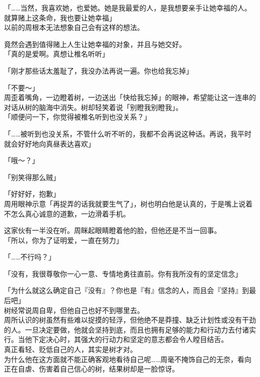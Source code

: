 「……当然，我喜欢她，也爱她。她是我最爱的人，是我想要亲手让她幸福的人。就算赌上这条命，我也要让她幸福」\\

以前的周根本无法想象自己会有这样的想法。

竟然会遇到值得赌上人生让她幸福的对象，并且与她交好。\\

「真的是爱啊。真想让椎名听听」

「刚才那些话太羞耻了，我没办法再说一遍。你也给我忘掉」

「不要～」\\

周歪着嘴角，一边瞪着树，一边送出「快给我忘掉」的眼神，希望能让这一连串的对话从树的脑海中消失。树却轻笑着说「别瞪我别瞪我」。\\

「顺便问一下，你觉得被椎名听到也没关系？」

「……被听到也没关系，不管什么听不听的，我都不会再说这种话。再说，我平时就会好好地向真昼表达喜欢」

「哦～？」

「别笑得那么贼」

「好好好，抱歉」\\

周用眼神示意「再捉弄的话我就要生气了」，树也明白他是认真的，于是嘴上说着不怎么真心诚意的道歉，一边滑着手机。

这家伙有一半没在听。周眯起眼睛瞪着他的脸，但他还是不当一回事。\\

「所以，你为了证明爱，一直在努力」

「……不行吗？」

「没有，我很尊敬你一心一意、专情地勇往直前。你有我所没有的坚定信念」

「为什么就这么确定自己『没有』？你也是『有』信念的人，而且会『坚持』到最后吧」\\

树经常说周自卑，但他自己也好不到哪里去。\\

周所认识的树虽然有些难以捉摸的轻浮，但他绝不是莽撞、缺乏计划性或没有干劲的人。一旦决定要做，他就会坚持到底，而且也拥有足够的能力和行动力去付诸实行。当他下定决心时，其强大的行动力和坚定的意志都会令人瞠目结舌。\\

真正看轻、贬低自己的人，其实是树才对。\\

为什么他在这方面就不能正确客观地看待自己呢……周毫不掩饰自己的无奈，看向正在自虐、伤害着自己信心的树，结果树却是一脸惊讶。\\

